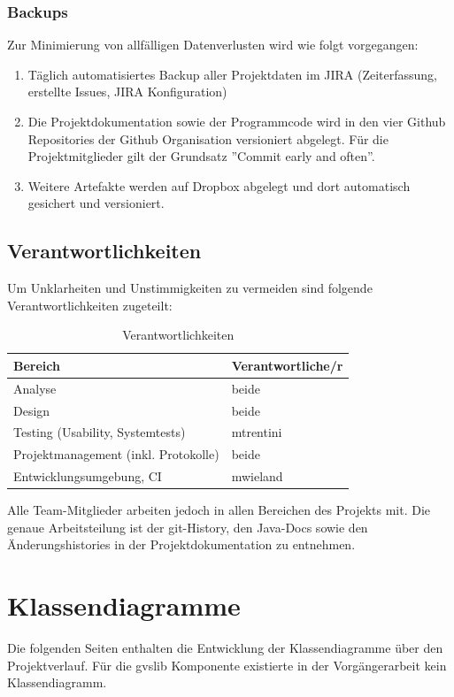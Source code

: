 \documentclass[11pt,a4paper,english,oneside]{book}
\numberwithin{equation}{chapter}
\begin{document}
	\subsection{Backups}
	\label{sec:backup}
	Zur Minimierung von allfälligen Datenverlusten wird wie folgt vorgegangen:
	
	\begin{enumerate}
		\item Täglich automatisiertes Backup aller Projektdaten im JIRA \cite{jira} (Zeiterfassung, erstellte Issues, JIRA Konfiguration)
		\item Die Projektdokumentation sowie der Programmcode wird in den vier Github Repositories der Github Organisation \cite{github} versioniert abgelegt. Für die Projektmitglieder gilt der Grundsatz ''Commit early and often''.
		\item Weitere Artefakte werden auf Dropbox \cite{dropbox} abgelegt und dort automatisch gesichert und versioniert.
	\end{enumerate}
	
	
	
	\section{Verantwortlichkeiten}
	Um Unklarheiten und Unstimmigkeiten zu vermeiden sind folgende Verantwortlichkeiten zugeteilt:
	
	\begin{table}[h!]
		\centering
		\begin{tabular}{l l}
			\toprule 
			Bereich & Verantwortliche/r \\
			\toprule 
			Analyse & beide \\
			Design & beide \\ 
			Testing (Usability, Systemtests) & mtrentini \\
			Projektmanagement (inkl. Protokolle) & beide \\
			Entwicklungsumgebung, CI & mwieland \\
			\bottomrule 
		\end{tabular} 
		\caption{Verantwortlichkeiten} 
	\end{table}
	
	Alle Team-Mitglieder arbeiten jedoch in allen Bereichen des Projekts mit. 
	Die genaue Arbeitsteilung ist der git-History, den Java-Docs sowie den Änderungshistories in der Projektdokumentation zu entnehmen.
	
	\chapter{Klassendiagramme} \label{ch:class-diagram}
	Die folgenden Seiten enthalten die Entwicklung der Klassendiagramme über den Projektverlauf. Für die \gls{gvslib} Komponente existierte in der Vorgängerarbeit kein Klassendiagramm.
	
\end{document}
